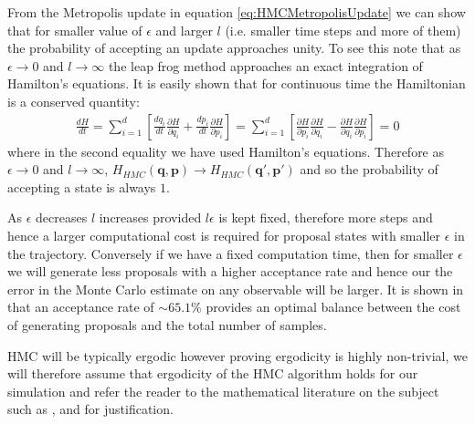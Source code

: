 \documentclass[12pt]{article}
\begin{document}
            From the Metropolis update in equation \ref{eq:HMCMetropolisUpdate} we can show that for smaller value of $\epsilon$ and larger $l$ (i.e. smaller time steps and more of them) the probability of accepting an update approaches unity. To see this note that as $\epsilon \rightarrow 0$ and $l \rightarrow \infty$ the leap frog method approaches an exact integration of Hamilton's equations. It is easily shown that for continuous time the Hamiltonian is a conserved quantity:
            \begin{align}
            \frac{dH}{dt}=\sum_{i=1}^{d}\left[\frac{dq_i}{dt}\frac{\partial H}{\partial q_i}+\frac{dp_i}{dt}\frac{\partial H}{\partial p_i}\right]=\sum_{i=1}^{d}\left[\frac{\partial H}{\partial p_i}\frac{\partial H}{\partial q_i}-\frac{\partial H}{\partial q_i}\frac{\partial H}{\partial p_i}\right]=0
            \end{align}
            where in the second equality we have used Hamilton's equations. Therefore as $\epsilon \rightarrow 0$ and $l\rightarrow \infty$, $H_{HMC}\left(\bm{q},\bm{p}\right) \rightarrow H_{HMC}\left(\bm{q}',\bm{p}'\right)$ and so the probability of accepting a state is always $1$.   

            As $\epsilon$ decreases $l$ increases provided $l\epsilon$ is kept fixed, therefore more steps and hence a larger computational cost is required for proposal states with smaller $\epsilon$ in the trajectory. Conversely if we have a fixed computation time, then for smaller $\epsilon$ we will generate less proposals with a higher acceptance rate and hence our the error in the Monte Carlo estimate on any observable will be larger. It is shown in \cite{beskos_pillai_roberts_sanz-serna_stuart_2013} that an acceptance rate of $\sim 65.1\%$ provides an optimal balance between the cost of generating proposals and the total number of samples.

            HMC will be typically ergodic \cite{neal_2011} however proving ergodicity is highly non-trivial, we will therefore assume that ergodicity of the HMC algorithm holds for our simulation and refer the reader to the mathematical literature on the subject such as \cite{bou-rabee_sanz-serna_2017}, \cite{durmus_moulines_saksman} and \cite{livingstone_betancourt_byrne_girolami} for justification.
\end{document}
